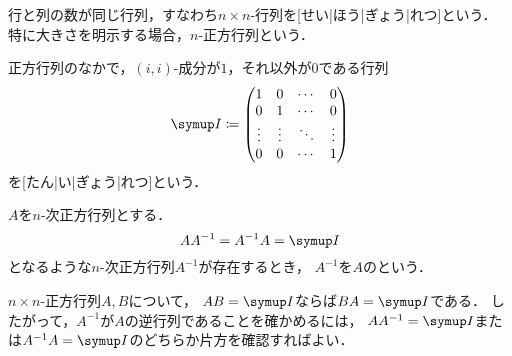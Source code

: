 \documentclass[../sotsu.tex]{subfiles}
\begin{document}
\begin{definition}[正方行列]
    行と列の数が同じ行列，すなわち$n \times n$-行列を[せい|ほう|ぎょう|れつ]という．
    特に大きさを明示する場合，$n$-正方行列という．
\end{definition}


\begin{definition}
    正方行列のなかで，$(i, i)$-成分が$1$，それ以外が$0$である行列
    \begin{equation}
        \umat \coloneq 
        \begin{pmatrix}
            1  &  0  &  \cdots  &  0  \\
            0  &  1  &  \cdots  &  0  \\
            \vdots & \vdots & \ddots & \vdots \\
            0  &  0  &  \cdots  &  1  
        \end{pmatrix}
    \end{equation}
    を[たん|い|ぎょう|れつ]という．
\end{definition}


\begin{definition}
    \label{dfn:inverse-of-matrix}
    $A$を$n$-次正方行列とする．
    \begin{equation}
        A A^{-1} = A^{-1} A = \umat
    \end{equation}
    となるような$n$-次正方行列$A^{-1}$が存在するとき，
    $A^{-1}$を$A$のという．
\end{definition}


\begin{theorem}
    $n \times n$-正方行列$A, B$について，
    $AB = \umat$ならば$BA = \umat$である．
    したがって，$A^{-1}$が$A$の逆行列であることを確かめるには，
    $A A^{-1} = \umat$または$A^{-1} A = \umat$のどちらか片方を確認すればよい．
\end{theorem}
\end{document}

